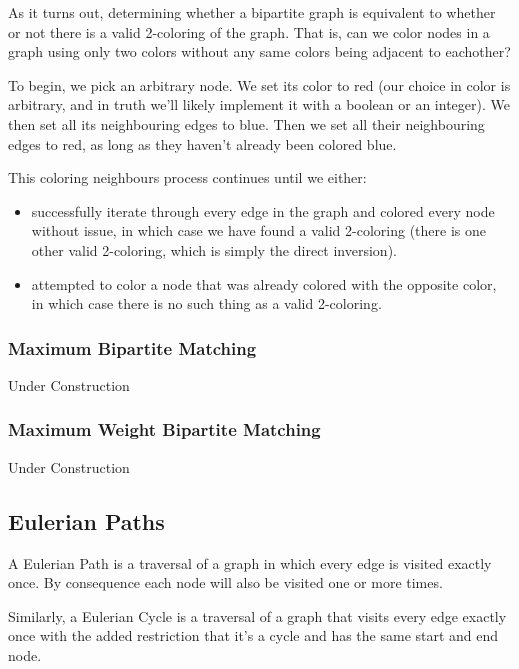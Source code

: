 As it turns out, determining whether a bipartite graph is equivalent to whether or not there is a valid 2-coloring of the graph. That is, can we color nodes in a graph using only two colors without any same colors being adjacent to eachother?

To begin, we pick an arbitrary node. We set its color to red (our choice in color is arbitrary, and in truth we'll likely implement it with a boolean or an integer). We then set all its neighbouring edges to blue. Then we set all their neighbouring edges to red, as long as they haven't already been colored blue.

This coloring neighbours process continues until we either:
\begin{itemize}
\item successfully iterate through every edge in the graph and colored every node without issue, in which case we have found a valid 2-coloring (there is one other valid 2-coloring, which is simply the direct inversion).
\item attempted to color a node that was already colored with the opposite color, in which case there is no such thing as a valid 2-coloring.
\end{itemize}

\subsubsection{Maximum Bipartite Matching}
 

Under Construction

\subsubsection{Maximum Weight Bipartite Matching}
  

Under Construction

\subsection{Eulerian Paths}
 

A Eulerian Path is a traversal of a graph in which every edge is visited exactly once. By consequence each node will also be visited one or more times.

Similarly, a Eulerian Cycle is a traversal of a graph that visits every edge exactly once with the added restriction that it's a cycle and has the same start and end node.

